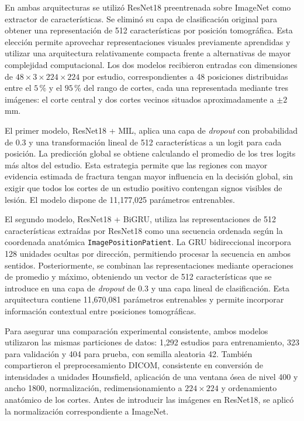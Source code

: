 En ambas arquitecturas se utilizó ResNet18 preentrenada sobre ImageNet como extractor de características. Se eliminó su capa de clasificación original para obtener una representación de 512 características por posición tomográfica. Esta elección permite aprovechar representaciones visuales previamente aprendidas y utilizar una arquitectura relativamente compacta frente a alternativas de mayor complejidad computacional. Los dos modelos recibieron entradas con dimensiones de $48 \times 3 \times 224 \times 224$ por estudio, correspondientes a 48 posiciones distribuidas entre el $5\,\%$ y el $95\,\%$ del rango de cortes, cada una representada mediante tres imágenes: el corte central y dos cortes vecinos situados aproximadamente a $\pm 2$ mm.

El primer modelo, ResNet18 + MIL, aplica una capa de \textit{dropout} con probabilidad de 0.3 y una transformación lineal de 512 características a un logit para cada posición. La predicción global se obtiene calculando el promedio de los tres logits más altos del estudio. Esta estrategia permite que las regiones con mayor evidencia estimada de fractura tengan mayor influencia en la decisión global, sin exigir que todos los cortes de un estudio positivo contengan signos visibles de lesión. El modelo dispone de 11,177,025 parámetros entrenables.

El segundo modelo, ResNet18 + BiGRU, utiliza las representaciones de 512 características extraídas por ResNet18 como una secuencia ordenada según la coordenada anatómica \texttt{ImagePositionPatient}. La GRU bidireccional incorpora 128 unidades ocultas por dirección, permitiendo procesar la secuencia en ambos sentidos. Posteriormente, se combinan las representaciones mediante operaciones de promedio y máximo, obteniendo un vector de 512 características que se introduce en una capa de \textit{dropout} de 0.3 y una capa lineal de clasificación. Esta arquitectura contiene 11,670,081 parámetros entrenables y permite incorporar información contextual entre posiciones tomográficas.

Para asegurar una comparación experimental consistente, ambos modelos utilizaron las mismas particiones de datos: 1,292 estudios para entrenamiento, 323 para validación y 404 para prueba, con semilla aleatoria 42. También compartieron el preprocesamiento DICOM, consistente en conversión de intensidades a unidades Hounsfield, aplicación de una ventana ósea de nivel 400 y ancho 1800, normalización, redimensionamiento a $224 \times 224$ y ordenamiento anatómico de los cortes. Antes de introducir las imágenes en ResNet18, se aplicó la normalización correspondiente a ImageNet.

